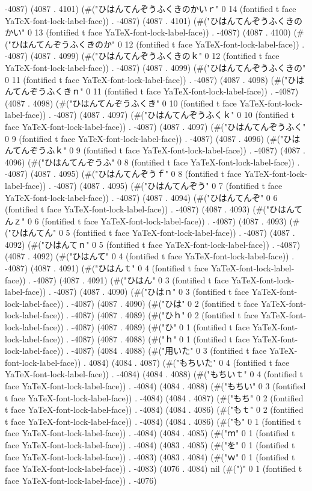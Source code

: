 -4087) (4087 . 4101) (#("ひはんてんぞうふくきのかいｒ" 0 14 (fontified t face YaTeX-font-lock-label-face)) . -4087) (4087 . 4101) (#("ひはんてんぞうふくきのかい" 0 13 (fontified t face YaTeX-font-lock-label-face)) . -4087) (4087 . 4100) (#("ひはんてんぞうふくきのか" 0 12 (fontified t face YaTeX-font-lock-label-face)) . -4087) (4087 . 4099) (#("ひはんてんぞうふくきのｋ" 0 12 (fontified t face YaTeX-font-lock-label-face)) . -4087) (4087 . 4099) (#("ひはんてんぞうふくきの" 0 11 (fontified t face YaTeX-font-lock-label-face)) . -4087) (4087 . 4098) (#("ひはんてんぞうふくきｎ" 0 11 (fontified t face YaTeX-font-lock-label-face)) . -4087) (4087 . 4098) (#("ひはんてんぞうふくき" 0 10 (fontified t face YaTeX-font-lock-label-face)) . -4087) (4087 . 4097) (#("ひはんてんぞうふくｋ" 0 10 (fontified t face YaTeX-font-lock-label-face)) . -4087) (4087 . 4097) (#("ひはんてんぞうふく" 0 9 (fontified t face YaTeX-font-lock-label-face)) . -4087) (4087 . 4096) (#("ひはんてんぞうふｋ" 0 9 (fontified t face YaTeX-font-lock-label-face)) . -4087) (4087 . 4096) (#("ひはんてんぞうふ" 0 8 (fontified t face YaTeX-font-lock-label-face)) . -4087) (4087 . 4095) (#("ひはんてんぞうｆ" 0 8 (fontified t face YaTeX-font-lock-label-face)) . -4087) (4087 . 4095) (#("ひはんてんぞう" 0 7 (fontified t face YaTeX-font-lock-label-face)) . -4087) (4087 . 4094) (#("ひはんてんぞ" 0 6 (fontified t face YaTeX-font-lock-label-face)) . -4087) (4087 . 4093) (#("ひはんてんｚ" 0 6 (fontified t face YaTeX-font-lock-label-face)) . -4087) (4087 . 4093) (#("ひはんてん" 0 5 (fontified t face YaTeX-font-lock-label-face)) . -4087) (4087 . 4092) (#("ひはんてｎ" 0 5 (fontified t face YaTeX-font-lock-label-face)) . -4087) (4087 . 4092) (#("ひはんて" 0 4 (fontified t face YaTeX-font-lock-label-face)) . -4087) (4087 . 4091) (#("ひはんｔ" 0 4 (fontified t face YaTeX-font-lock-label-face)) . -4087) (4087 . 4091) (#("ひはん" 0 3 (fontified t face YaTeX-font-lock-label-face)) . -4087) (4087 . 4090) (#("ひはｎ" 0 3 (fontified t face YaTeX-font-lock-label-face)) . -4087) (4087 . 4090) (#("ひは" 0 2 (fontified t face YaTeX-font-lock-label-face)) . -4087) (4087 . 4089) (#("ひｈ" 0 2 (fontified t face YaTeX-font-lock-label-face)) . -4087) (4087 . 4089) (#("ひ" 0 1 (fontified t face YaTeX-font-lock-label-face)) . -4087) (4087 . 4088) (#("ｈ" 0 1 (fontified t face YaTeX-font-lock-label-face)) . -4087) (4084 . 4088) (#("用いた" 0 3 (fontified t face YaTeX-font-lock-label-face)) . 4084) (4084 . 4087) (#("もちいた" 0 4 (fontified t face YaTeX-font-lock-label-face)) . -4084) (4084 . 4088) (#("もちいｔ" 0 4 (fontified t face YaTeX-font-lock-label-face)) . -4084) (4084 . 4088) (#("もちい" 0 3 (fontified t face YaTeX-font-lock-label-face)) . -4084) (4084 . 4087) (#("もち" 0 2 (fontified t face YaTeX-font-lock-label-face)) . -4084) (4084 . 4086) (#("もｔ" 0 2 (fontified t face YaTeX-font-lock-label-face)) . -4084) (4084 . 4086) (#("も" 0 1 (fontified t face YaTeX-font-lock-label-face)) . -4084) (4084 . 4085) (#("ｍ" 0 1 (fontified t face YaTeX-font-lock-label-face)) . -4084) (4083 . 4085) (#("を" 0 1 (fontified t face YaTeX-font-lock-label-face)) . -4083) (4083 . 4084) (#("ｗ" 0 1 (fontified t face YaTeX-font-lock-label-face)) . -4083) (4076 . 4084) nil (#(")" 0 1 (fontified t face YaTeX-font-lock-label-face)) . -4076) 